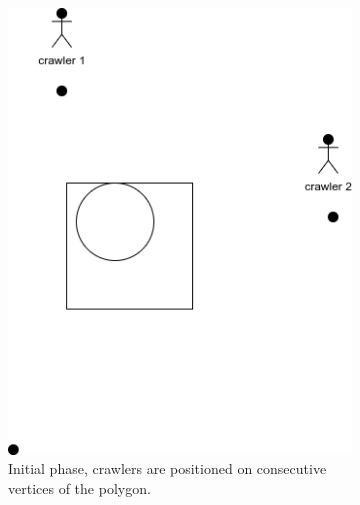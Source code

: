 \begin{figure}[h!]
	\centering
	\begin{subfigure}[t]{0.27\linewidth}
		\centering
		\includegraphics[width=\linewidth]{graphics/triangle_1.png}
		\caption{Initial phase, crawlers are positioned on consecutive vertices of the polygon.}
		\label{fig:triangle_1}
	\end{subfigure}
	\hfill
	\begin{subfigure}[t]{0.27\linewidth}
		\centering

\end{subfigure}
\end{figure}

